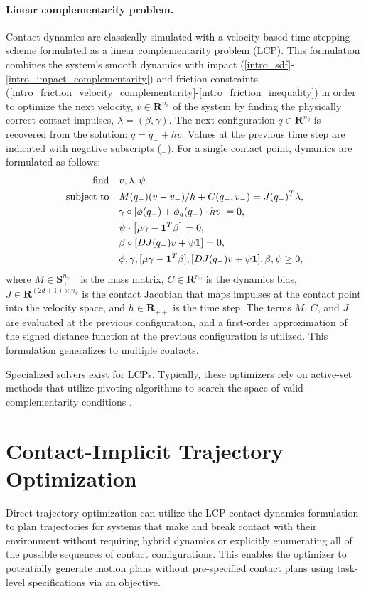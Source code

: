 \paragraph{Linear complementarity problem.}
Contact dynamics are classically simulated with a velocity-based
time-stepping scheme formulated as a linear complementarity problem (LCP). This formulation combines the system's smooth dynamics with impact (\ref{intro_sdf}-\ref{intro_impact_complementarity}) and friction constraints (\ref{intro_friction_velocity_complementarity}-\ref{intro_friction_inequality}) in order to optimize the next velocity, $v \in \mathbf{R}^{n_v}$ of the system by finding the physically correct contact impulses, $\lambda = (\beta, \gamma)$. The next configuration $q \in \mathbf{R}^{n_q}$ is recovered from the solution: $q = q_{-} + h v$. Values at the previous time step are indicated with negative subscripts ($_{-}$). For a single contact point, dynamics are formulated as follows: 
\begin{align}
	\label{intro_feas_prob}
	{\mbox{find}} \quad & v, \lambda, \psi \\
	\mbox{subject to} \quad & M(q_{-}) (v - v_{-}) / h + C(q_{-}, v_{-}) = J(q_{-})^T \lambda, \notag \\
	& \gamma \circ [\phi(q_{-}) + \phi_q(q_{-}) \cdot h v] = 0, \notag\\
	& \psi \cdot \left[\mu \gamma - \textbf{1}^T \beta \right] = 0, \notag \\
	& \beta \circ [D J(q_{-}) v + \psi \textbf{1}] = 0, \notag\\
	& \phi, \gamma, [\mu \gamma - \textbf{1}^T \beta], [D J(q_{-}) v + \psi \textbf{1}], \beta, \psi \geq 0, \notag
\end{align}
where $M \in \mathbf{S}_{++}^{n_v}$ is the mass matrix, $C \in \mathbf{R}^{n_v}$ is the dynamics bias, $J \in \mathbf{R}^{(2d + 1) \times n_v}$ is the contact Jacobian that maps impulses at the contact point into the velocity space, and $h \in \mathbf{R}_{++}$ is the time step. The terms $M$, $C$, and $J$ are evaluated at the previous configuration, and a first-order approximation of the signed distance function at the previous configuration is utilized. This formulation generalizes to multiple contacts. 

Specialized solvers exist for LCPs. Typically, these optimizers rely on active-set methods that utilize pivoting algorithms to search the space of valid complementarity conditions \cite{dirkse1995path}.

\section{Contact-Implicit Trajectory Optimization}
Direct trajectory optimization can utilize the LCP contact dynamics formulation to plan trajectories for systems that make and break contact with their environment \cite{posa2014direct} without requiring hybrid dynamics \cite{westervelt2003hybrid} or explicitly enumerating all of the possible sequences of contact configurations. This enables the optimizer to potentially generate motion plans without pre-specified contact plans using task-level specifications via an objective.
 
